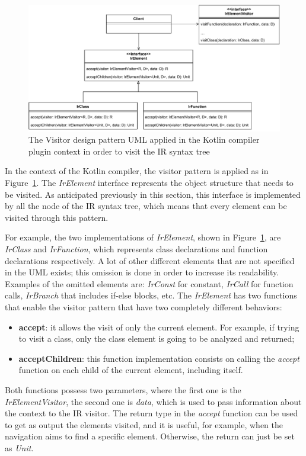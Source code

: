 \begin{figure}[!ht]
    \centering
    \includegraphics[scale=0.75]{document/chapters/2-metaprogramming/images/visitor_uml_kotlin_compiler.pdf}
    \caption{The Visitor design pattern UML applied in the Kotlin compiler plugin context in order to visit the IR syntax tree}
    \label{fig:visitor_uml_kotlin_compiler}
\end{figure}
In the context of the Kotlin compiler, the visitor pattern is applied as in Figure~\ref{fig:visitor_uml_kotlin_compiler}. The \textit{IrElement} interface represents the object structure that needs to be visited. As anticipated previously in this section, this interface is implemented by all the node of the IR syntax tree, which means that every element can be visited through this pattern.

For example, the two implementations of \textit{IrElement}, shown in Figure~\ref{fig:visitor_uml_kotlin_compiler}, are \textit{IrClass} and \textit{IrFunction}, which represents class declarations and function declarations respectively. A lot of other different elements that are not specified in the UML exists; this omission is done in order to increase its readability. Examples of the omitted elements are: \textit{IrConst} for constant, \textit{IrCall} for function calls, \textit{IrBranch} that includes if-else blocks, etc.\newline
The \textit{IrElement} has two functions that enable the visitor pattern that have two completely different behaviors:
\begin{itemize}
    \item \textbf{accept}: it allows the visit of only the current element. For example, if trying to visit a class, only the class element is going to be analyzed and returned;
    \item \textbf{acceptChildren}: this function implementation consists on calling the \textit{accept} function on each child of the current element, including itself.
\end{itemize}
Both functions possess two parameters, where the first one is the \textit{IrElementVisitor}, the second one is \textit{data}, which is used to pass information about the context to the IR visitor.\newline
The return type in the \textit{accept} function can be used to get as output the elements visited, and it is useful, for example, when the navigation aims to find a specific element. Otherwise, the return can just be set as \textit{Unit}.

